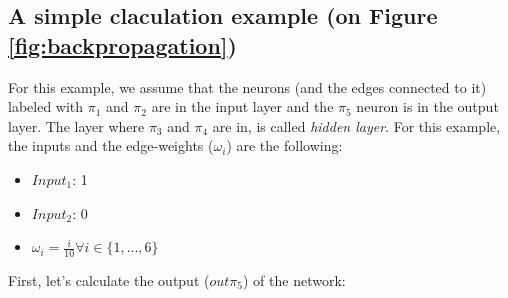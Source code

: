 \subsection{A simple claculation example (on Figure \ref{fig:backpropagation})}
\label{subs:Example}

For this example, we assume that the neurons (and the edges connected to it) labeled with $\pi_1$ and $\pi_2$ are in the input layer and the $\pi_5$ neuron is in the output layer. The layer where $\pi_3$ and $\pi_4$ are in, is called \textit{hidden layer}. For this example, the inputs and the edge-weights ($\omega_i$) are the following:
\begin{itemize}
	\item $Input_1$: 1
	\item $Input_2$: 0
	\item $\omega_i=\frac{i}{10}\forall i \in \{1,...,6\}$
\end{itemize}
First, let's calculate the output ($out\pi_5$) of the network:


